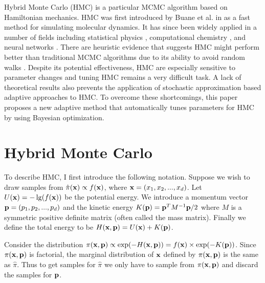 \documentclass{article} %
\begin{document}
Hybrid Monte Carlo (HMC) is a particular MCMC algorithm based on Hamiltonian mechanics. HMC was first introduced by Buane et al. in \cite{duane1987hybrid} as a fast method for simulating molecular dynamics. It has since been widely applied in a number of fields including statistical physics \cite{gupta1988tuning, sexton1992hamiltonian}, computational chemistry \cite{hansmann1996molecular, tuckerman1993efficient}, and neural networks \cite{zlochin2001manifold, neal1996bayesian}. There are heuristic evidence that suggests HMC might perform better than traditional MCMC algorithms due to its ability to avoid random walks \cite{chen2001exploring, neal2010mcmc}. Despite its potential effectiveness, HMC are especially sensitive to parameter changes and tuning HMC remains a very difficult task. A lack of theoretical results also prevents the application of stochastic approximation based adaptive approaches to HMC. To overcome these shortcomings, this paper proposes a new adaptive method that automatically tunes parameters for HMC by using Bayesian optimization. 




\section{Hybrid Monte Carlo}
To describe HMC, I first introduce the following notation. Suppose we wish to draw samples from $\hat{\pi}({\bf x}) \propto f({\bf x})$, where ${\bf x} = (x_{1}, x_{2},...,x_{d})$. Let $U({\bf x}) =  -\lg(f({\bf x}))$ be the potential energy. We introduce a momentum vector ${\bf p} = (p_{1}, p_{2},...,p_{d})$ and the kinetic energy $K({\bf p}) = {\bf p}^{T}M^{-1}{\bf p}/2$ where $M$ is a symmetric positive definite matrix (often called the mass matrix). Finally we define the total energy to be $H({\bf x}, {\bf p}) = U({\bf x}) + K({\bf p})$.  


Consider the distribution $\pi({\bf x}, {\bf p}) \propto \exp(-H({\bf x}, {\bf p})) = f({\bf x})\times\exp(-K({\bf p}))$. Since $\pi({\bf x}, {\bf p})$ is factorial, the marginal distribution of ${\bf x}$ defined by $\pi({\bf x}, {\bf p})$ is the same as $\hat{\pi}$. Thus to get samples for $\hat{\pi}$ we only have to sample from $\pi({\bf x}, {\bf p})$ and discard the samples for ${\bf p}$.
\end{document}
